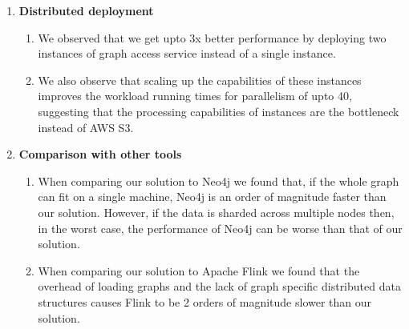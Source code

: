 \begin{enumerate}
\begin{enumerate}
        \end{enumerate}
    \item \textbf{Distributed deployment}
        \begin{enumerate}
            \item We observed that we get upto 3x better performance by
                deploying two instances of graph access service instead of a
                single instance.
            \item We also observe that scaling up the capabilities of these
                instances improves the workload running times for parallelism of
                upto 40, suggesting that the processing capabilities of
                instances are the bottleneck instead of AWS S3. 
        \end{enumerate}
    \item \textbf{Comparison with other tools}
        \begin{enumerate}
            \item When comparing our solution to Neo4j we found that, if the
                whole graph can fit on a single machine, Neo4j is an
                order of magnitude faster than our solution. However, if the
                data is sharded across multiple nodes then, in the worst case,
                the performance of Neo4j can be worse than that of our solution.
            \item When comparing our solution to Apache Flink we found that the
                overhead of loading graphs and the lack of graph specific
                distributed data structures causes Flink to be 2 orders of
                magnitude slower than our solution.
        \end{enumerate}
\end{enumerate}
